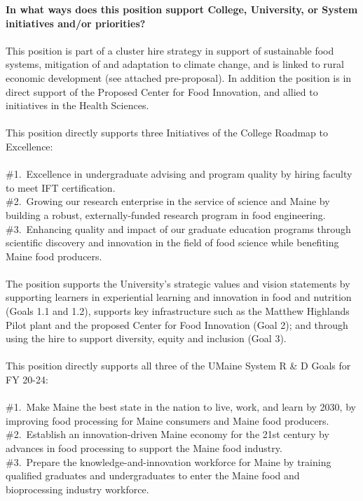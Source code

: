 \documentclass[11pt]{article}
\begin{document}
\newpage
\noindent\textbf{\rmfamily In what ways does this position support College, University, or System initiatives and/or priorities?}
\\~\\
This position is part of a cluster hire strategy in support of sustainable food systems, mitigation of and adaptation to climate change, and is linked to rural economic development (see attached pre-proposal). In addition the position is in direct support of the Proposed Center for Food Innovation, and allied to initiatives in the Health Sciences.\\~\\ 
This position directly supports three Initiatives of the College Roadmap to Excellence:\\~\\
\#1.~Excellence in undergraduate advising and program quality by hiring faculty to meet IFT certification.\\
\#2.~Growing our research enterprise in the service of science and Maine by building a robust, externally-funded research program in food engineering.\\
\#3.~Enhancing quality and impact of our graduate education programs through scientific discovery and innovation in the field of food science while benefiting Maine food producers.
\\~\\
The position supports the University's strategic values and vision statements by supporting learners in experiential learning and innovation in food and nutrition (Goals 1.1 and 1.2), supports key infrastructure such as the Matthew Highlands Pilot plant and the proposed Center for Food Innovation (Goal 2); and through using the hire to support diversity, equity and inclusion (Goal 3).
\\~\\
This position directly supports all three of the UMaine System R \& D Goals for FY 20-24:\\~\\
\#1.~Make Maine the best state in the nation to live, work, and learn by 2030, by improving food processing for Maine consumers and Maine food producers. \\
\#2.~Establish an innovation-driven Maine economy for the 21st century by advances in food processing to support the Maine food industry.\\
\#3.~Prepare the knowledge-and-innovation workforce for Maine by training qualified graduates and undergraduates to enter the Maine food and bioprocessing industry workforce.\\~\\
\end{document}
